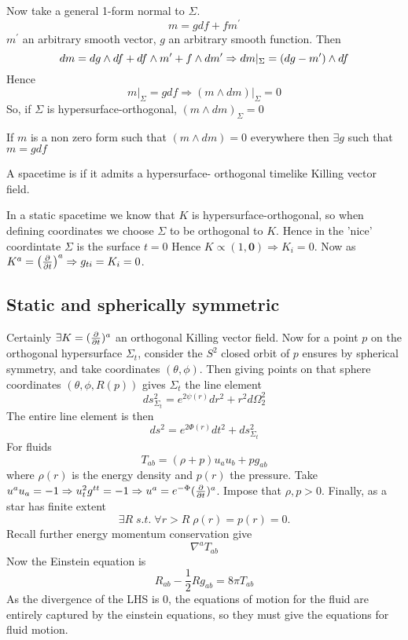 \documentclass{article}
\begin{document}
Now take a general 1-form normal to $\Sigma$. 
\[
m = g df + f m^\prime
\]
$m^\prime$ an arbitrary smooth vector, $g$ an arbitrary smooth function. Then 
\[
dm = dg \wedge df + df \wedge m^\prime + f \wedge dm^\prime \\
\Rightarrow dm \rvert_\Sigma = (dg-m^\prime) \wedge df 
\]
Hence
\[
m\rvert_\Sigma = g df \Rightarrow (m \wedge dm) \rvert_\Sigma =0
\]
So, if $\Sigma$ is hypersurface-orthogonal, $(m\wedge dm)_\Sigma = 0$

\begin{theorem}[Frobenius]
If $m$ is a non zero form such that $(m\wedge dm) = 0$ everywhere then $\exists g$ such that $m = g df$
\end{theorem}

\begin{definition}[Static]
A spacetime is  if it admits a hypersurface- orthogonal timelike Killing vector field. 
\end{definition}

\begin{idea}
In a static spacetime we know that $K$ is hypersurface-orthogonal, so when defining coordinates we choose $\Sigma$ to be orthogonal to $K$. Hence in the 'nice' coordintate $\Sigma$ is the surface $t=0$ Hence $K \propto (1,\bm{0}) \Rightarrow K_i = 0$. Now as $K^a = \left( \frac{\partial}{\partial t} \right)^a \Rightarrow g_{ti} = K_i = 0$.
\end{idea}

\subsection{Static and spherically symmetric}
Certainly $\exists K = (\frac{\partial}{\partial t})^a$ an orthogonal Killing vector field. Now for a point $p$ on the orthogonal hypersurface $\Sigma_t$, consider the $S^2$ closed orbit of $p$ ensures by spherical symmetry, and take coordinates $(\theta,\phi)$. Then giving points on that sphere coordinates $(\theta,\phi,R(p))$ gives $\Sigma_t$ the line element 
\[
ds^2_{\Sigma_t} = e^{2\psi(r)}dr^2 + r^2 d\Omega_2^2
\]
The entire line element is then 
\[
ds^2 = e^{2\Phi(r)}dt^2 + ds^2_{\Sigma_t}
\]
For fluids
\[
T_{ab} = (\rho + p)u_a u_b + pg_{ab}
\]
where $\rho(r)$ is the energy density and $p(r)$ the pressure. Take $u^a u_a = -1 \Rightarrow u_t^2 g^{tt}=-1 \Rightarrow u^a = e^{-\Phi}(\frac{\partial}{\partial t})^a$. Impose that $\rho,p >0$. Finally, as a star has finite extent
\[
\exists R \; s.t. \; \forall r > R \; \rho(r) = p(r) =0.
\]
Recall further energy momentum conservation give 
\[
\nabla^a T_{ab}
\]
Now the Einstein equation is 
\[
R_{ab} - \frac{1}{2}R g_{ab} = 8 \pi T_{ab}
\]
As the divergence of the LHS is 0, the equations of motion for the fluid are entirely captured by the einstein equations, so they must give the equations for fluid motion. 
\end{document}
